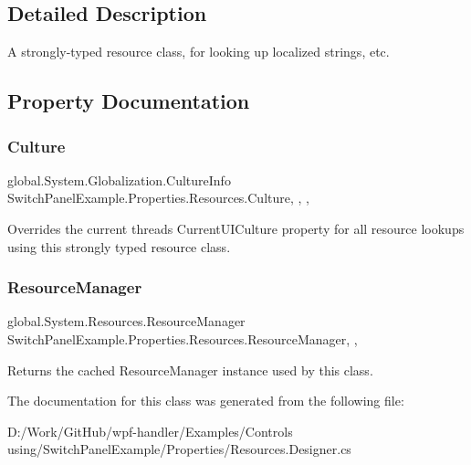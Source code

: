 \subsection{Detailed Description}
A strongly-\/typed resource class, for looking up localized strings, etc. 



\subsection{Property Documentation}
\mbox{\label{class_switch_panel_example_1_1_properties_1_1_resources_a1dfff582a9857cbbe958e3257e6c01e7}} 
\subsubsection{\texorpdfstring{Culture}{Culture}}
{\footnotesize\ttfamily global.\+System.\+Globalization.\+Culture\+Info Switch\+Panel\+Example.\+Properties.\+Resources.\+Culture\hspace{0.3cm}{\ttfamily [static]}, {\ttfamily [get]}, {\ttfamily [set]}, {\ttfamily [package]}}



Overrides the current thread\textquotesingle{}s Current\+U\+I\+Culture property for all resource lookups using this strongly typed resource class. 

\mbox{\label{class_switch_panel_example_1_1_properties_1_1_resources_a956f4bc67df44cb911483575c8cd9d66}} 
\subsubsection{\texorpdfstring{Resource\+Manager}{ResourceManager}}
{\footnotesize\ttfamily global.\+System.\+Resources.\+Resource\+Manager Switch\+Panel\+Example.\+Properties.\+Resources.\+Resource\+Manager\hspace{0.3cm}{\ttfamily [static]}, {\ttfamily [get]}, {\ttfamily [package]}}



Returns the cached Resource\+Manager instance used by this class. 



The documentation for this class was generated from the following file\+:\begin{DoxyCompactItemize}
\item 
D\+:/\+Work/\+Git\+Hub/wpf-\/handler/\+Examples/\+Controls using/\+Switch\+Panel\+Example/\+Properties/Resources.\+Designer.\+cs\end{DoxyCompactItemize}
